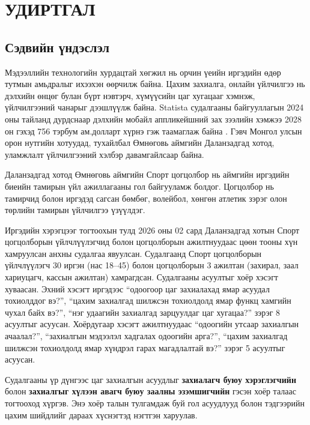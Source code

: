 
\pagecolor{white}

\section*{\centering \Large УДИРТГАЛ}

\subsection*{Сэдвийн үндэслэл}

Мэдээллийн технологийн хурдацтай хөгжил нь орчин үеийн иргэдийн өдөр тутмын амьдралыг ихээхэн өөрчилж байна. Цахим захиалга, онлайн үйлчилгээ нь дэлхийн өнцөг булан бүрт нэвтэрч, хүмүүсийн цаг хугацааг хэмнэж, үйлчилгээний чанарыг дээшлүүлж байна. Statista судалгааны байгууллагын 2024 оны тайланд дурдснаар дэлхийн мобайл аппликейшний зах зээлийн хэмжээ 2028 он гэхэд 756 тэрбум ам.долларт хүрнэ гэж таамаглаж байна \cite{statista_market}. Гэвч Монгол улсын орон нутгийн хотуудад, тухайлбал Өмнөговь аймгийн Даланзадгад хотод, уламжлалт үйлчилгээний хэлбэр давамгайлсаар байна.

Даланзадгад хотод Өмнөговь аймгийн Спорт цогцолбор нь аймгийн иргэдийн биеийн тамирын үйл ажиллагааны гол байгууламж болдог. Цогцолбор нь тамирчид болон иргэдэд сагсан бөмбөг, волейбол, хөнгөн атлетик зэрэг олон төрлийн тамирын үйлчилгээ үзүүлдэг.

Иргэдийн хэрэгцээг тогтоохын тулд 2026 оны 02 сард Даланзадгад хотын Спорт цогцолборын үйлчлүүлэгчид болон цогцолборын ажилтнуудаас цөөн тооны хүн хамруулсан анхны судалгаа явуулсан. Судалгаанд Спорт цогцолборын үйлчлүүлэгч 30 иргэн (нас 18--45) болон цогцолборын 3 ажилтан (захирал, заал хариуцагч, кассын ажилтан) хамрагдсан. Судалгааны асуултыг хоёр хэсэгт хуваасан. Эхний хэсэгт иргэдээс ``одоогоор цаг захиалахад ямар асуудал тохиолддог вэ?'', ``цахим захиалгад шилжсэн тохиолдолд ямар функц хамгийн чухал байх вэ?'', ``нэг удаагийн захиалгад зарцуулдаг цаг хугацаа?'' зэрэг 8 асуултыг асуусан. Хоёрдугаар хэсэгт ажилтнуудаас ``одоогийн утсаар захиалгын ачаалал?'', ``захиалгын мэдээлэл хадгалах одоогийн арга?'', ``цахим захиалгад шилжсэн тохиолдолд ямар хүндрэл гарах магадлалтай вэ?'' зэрэг 5 асуултыг асуусан.

Судалгааны үр дүнгээс цаг захиалгын асуудлыг \textbf{захиалагч буюу хэрэглэгчийн} болон \textbf{захиалгыг хүлээн авагч буюу заалны эзэмшигчийн} гэсэн хоёр талаас тогтооход хүргэв. Энэ хоёр талын тулгамдаж буй гол асуудлууд болон тэдгээрийн цахим шийдлийг дараах хүснэгтэд нэгтгэн харуулав.

